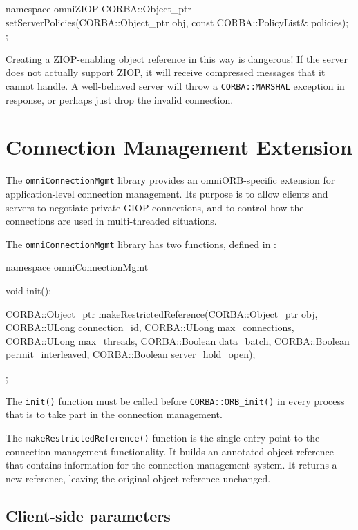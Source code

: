 \documentclass[11pt,oneside,a4paper]{book}
\newcommand{\code}[1]{\texttt{#1}}
\newcommand{\op}[1]{\texttt{#1()}}
\begin{document}
\begin{cxxlisting}
namespace omniZIOP {
  CORBA::Object_ptr
  setServerPolicies(CORBA::Object_ptr obj, const CORBA::PolicyList& policies);
};
\end{cxxlisting}

Creating a ZIOP-enabling object reference in this way is dangerous!
If the server does not actually support ZIOP, it will receive
compressed messages that it cannot handle. A well-behaved server will
throw a \code{CORBA::MARSHAL} exception in response, or perhaps just
drop the invalid connection.



\section{Connection Management Extension}

The \code{omniConnectionMgmt} library provides an omniORB-specific
extension for application-level connection management. Its purpose is
to allow clients and servers to negotiate private GIOP connections,
and to control how the connections are used in multi-threaded
situations.

The \code{omniConnectionMgmt} library has two functions, defined in
:

\begin{cxxlisting}
namespace omniConnectionMgmt {

  void init();

  CORBA::Object_ptr
  makeRestrictedReference(CORBA::Object_ptr obj,
			  CORBA::ULong      connection_id,
			  CORBA::ULong      max_connections,
			  CORBA::ULong      max_threads,
			  CORBA::Boolean    data_batch,
			  CORBA::Boolean    permit_interleaved,
			  CORBA::Boolean    server_hold_open);
};
\end{cxxlisting}

\noindent The \op{init} function must be called before
\op{CORBA::ORB\_init} in every process that is to take part in the
connection management.

The \op{makeRestrictedReference} function is the single entry-point to
the connection management functionality. It builds an annotated object
reference that contains information for the connection management
system. It returns a new reference, leaving the original object
reference unchanged.

\subsection{Client-side parameters}
\end{document}
